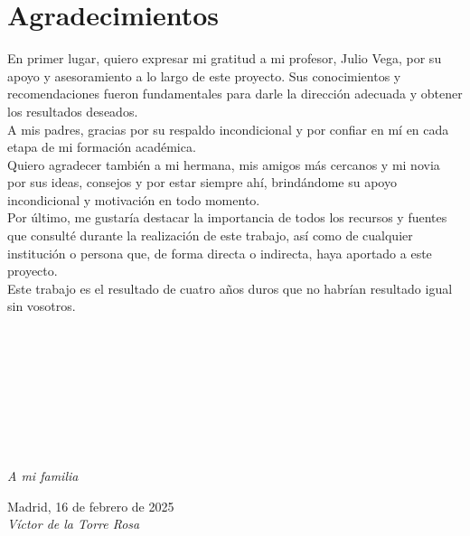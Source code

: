 \cleardoublepage

\chapter*{Agradecimientos}

En primer lugar, quiero expresar mi gratitud a mi profesor, Julio Vega, por su apoyo y asesoramiento a lo largo de este proyecto. Sus conocimientos y recomendaciones fueron fundamentales para darle la dirección adecuada y obtener los resultados deseados.\\

A mis padres, gracias por su respaldo incondicional y por confiar en mí en cada etapa de mi formación académica.\\

Quiero agradecer también a mi hermana, mis amigos más cercanos y mi novia por sus ideas, consejos y por estar siempre ahí, brindándome su apoyo incondicional y motivación en todo momento.\\

Por último, me gustaría destacar la importancia de todos los recursos y fuentes que consulté durante la realización de este trabajo, así como de cualquier institución o persona que, de forma directa o indirecta, haya aportado a este proyecto.\\

Este trabajo es el resultado de cuatro años duros que no habrían resultado igual sin vosotros.\\
\ %

\

\

\

\

\begin{flushright}
		\vspace{4.0 cm}
		\emph{A mi familia}\\
		\par
		\vspace{1.0 cm}
		Madrid, 16 de febrero de 2025\\ %
		\emph{Víctor de la Torre Rosa}
\end{flushright}

\thispagestyle{empty}


